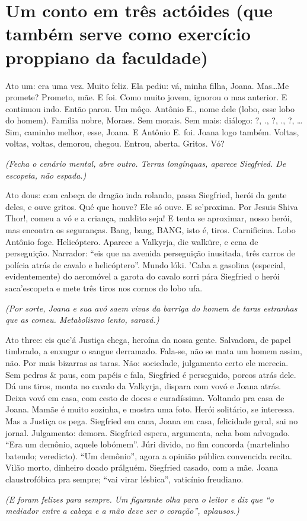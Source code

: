 \chapter{Um conto em três actóides (que também serve como exercício proppiano da faculdade)}

Ato um: era uma vez. Muito feliz. Ela pediu: vá, minha filha, Joana. Mas\ldots Me promete? Prometo, mãe. E foi. Como muito jovem, ignorou o mas anterior. E continuou indo. Então parou. Um môço. Antônio E., nome dele (lobo, esse lobo do homem). Família nobre, Moraes. Sem morais. Sem mais: diálogo: ?, ., ?, ., ?, \ldots Sim, caminho melhor, esse, Joana. E Antônio E. foi. Joana logo também. Voltas, voltas, voltas, demorou, chegou. Entrou, aberta. Gritos. Vó?

\begin{center}
\emph{(Fecha o cenário mental, abre outro. Terras longínquas, aparece Siegfried. De escopeta, não espada.)}
\end{center}

Ato dous: com cabeça de dragão inda rolando, passa Siegfried, herói da gente deles, e ouve gritos. Qué que houve? Ele só ouve. E se'proxima. Por Jesuis Shiva Thor!, comeu a vó e a criança, maldito seja! E tenta se aproximar, nosso herói, mas encontra os seguranças. Bang, bang, BANG, isto é, tiros. Carnificina. Lobo Antônio foge. Helicóptero. Aparece a Valkyrja, die walküre, e cena de perseguição. Narrador: ``eis que na avenida perseguição inusitada, três carros de polícia atrás de cavalo e helicóptero''. Mundo lóki. 'Caba a gasolina (especial, evidentemente) do aeromóvel a garota do cavalo sorri pára Siegfried o herói saca'escopeta e mete três tiros nos cornos do lobo ufa.

\begin{center}
\emph{(Por sorte, Joana e sua avó saem vivas da barriga do homem de taras estranhas que as comeu. Metabolismo lento, saravá.)}
\end{center}

Ato three: eis que'á Justiça chega, heroína da nossa gente. Salvadora, de papel timbrado, a enxugar o sangue derramado. Fala-se, não se mata um homem assim, não. Por mais bizarras as taras. Não: sociedade, julgamento certo ele merecia. Sem pedras \& paus, com papéis e fala, Siegfried é perseguido, porcos atrás dele. Dá uns tiros, monta no cavalo da Valkyrja, dispara com vovó e Joana atrás. Deixa vovó em casa, com cesto de doces e curadíssima. Voltando pra casa de Joana. Mamãe é muito sozinha, e mostra uma foto. Herói solitário, se interessa. Mas a Justiça os pega. Siegfried em cana, Joana em casa, felicidade geral, sai no jornal. Julgamento: demora. Siegfried espera, argumenta, acha bom advogado. ``Era um demônio, aquele lobómem''. Júri divido, no fim concorda (martelinho batendo; veredicto). ``Um demônio'', agora a opinião pública convencida recita. Vilão morto, dinheiro doado prálguém. Siegfried casado, com a mãe. Joana claustrofóbica pra sempre; ``vai virar lésbica'', vaticínio freudiano.

\begin{center}
\emph{(E foram felizes para sempre. Um figurante olha para o leitor e diz que ``o mediador entre a cabeça e a mão deve ser o coração'', aplausos.)}
\end{center}
